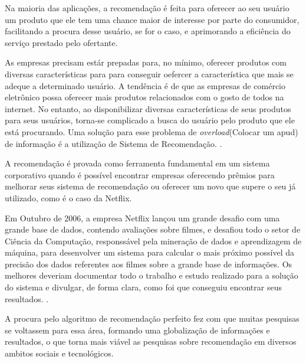 \documentclass[12pt,
				openright,
				twoside,
				a4paper,
				apter=TITLE,
				section=TITLE,
				subsection=TITLE,
				chapter=TITLE,
				english,
				brazil]{abntex2}
\begin{document}
Na maioria das aplicações, a recomendação é feita para oferecer ao seu usuário um produto que ele tem uma chance maior de interesse por parte do consumidor, facilitando a procura desse usuário, se for o caso, e aprimorando a eficiência do serviço prestado pelo ofertante.

\begin{citacao}
As empresas precisam estár prepadas para, no mínimo, oferecer produtos com diversas características para para conseguir oefercer a característica que mais se adeque a determinado usuário. A tendência é de que as empresas de comércio eletrônico possa oferecer mais produtos relacionados com o gosto de todos na internet. No entanto, ao disponibilizar diversas características de seus produtos para seus usuários, torna-se complicado a busca do usuário pelo produto que ele está procurando. Uma solução para esse problema de \textit{overload}(Colocar um apud) de informação é a utilização de Sistema de Recomendação.  
\cite[4.0]{schafer1999recommender}.
\end{citacao}

A recomendação é provada como ferramenta fundamental em um sistema corporativo quando é possível encontrar empresas oferecendo prêmios para melhorar seus sistema de recomendação ou oferecer um novo que supere o seu já utilizado, como é o caso da Netflix.

\begin{citacao}
Em Outubro de 2006, a empresa Netflix lançou um grande desafio com uma grande base de dados, contendo avaliações sobre filmes, e desafiou todo o setor de Ciência da Computação, responssável pela mineração de dados e aprendizagem de máquina, para desenvolver um sistema para calcular o mais próximo possível da precisão dos dados referentes aos filmes sobre a grande base de informações. Os melhores deveriam documentar todo o trabalho e estudo realizado para a solução do sistema e divulgar, de forma clara, como foi que conseguiu encontrar seus resultados. 
\cite[4.0]{bennett2007netflix}.
\end{citacao}

A procura pelo algoritmo de recomendação perfeito fez com que muitas pesquisas se voltassem para essa área, formando uma globalização de informações e resultados, o que torna mais viável as pesquisas sobre recomendação em diversos ambitos sociais e tecnológicos. 

\end{document}
